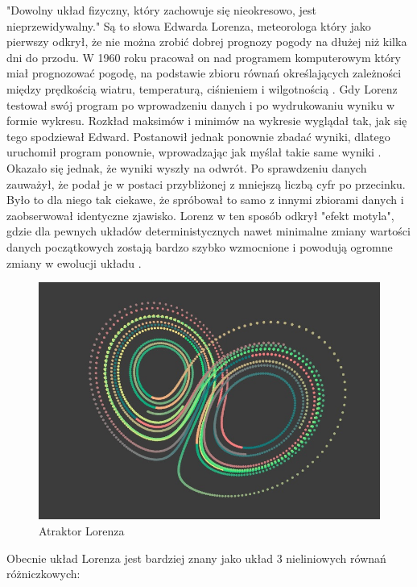 \documentclass[a4paper,12pt,reqno]{article}
\begin{document}
"Dowolny układ fizyczny, który zachowuje się nieokresowo, jest nieprzewidywalny." Są to słowa Edwarda Lorenza, meteorologa który jako pierwszy odkrył, że nie można zrobić dobrej prognozy pogody na dłużej niż kilka dni do przodu. W 1960 roku pracował on nad programem komputerowym który miał prognozować pogodę, na podstawie zbioru równań określających zależności między prędkością wiatru, temperaturą, ciśnieniem i wilgotnością \cite{burze_motyle}. Gdy Lorenz testował swój program po wprowadzeniu danych i po wydrukowaniu wyniku w formie wykresu. Rozkład maksimów i minimów na wykresie wyglądał tak, jak się tego spodziewał Edward. Postanowił jednak ponownie zbadać wyniki, dlatego uruchomił program ponownie, wprowadzając jak myślał takie same wyniki \cite{burze_motyle}. Okazało się jednak, że wyniki wyszły na odwrót. Po sprawdzeniu danych zauważył, że podał je w postaci przybliżonej z mniejszą liczbą cyfr po przecinku. Było to dla niego tak ciekawe, że spróbował to samo z innymi zbiorami danych i zaobserwował identyczne zjawisko. Lorenz w ten sposób odkrył "efekt motyla", gdzie dla pewnych układów deterministycznych nawet minimalne zmiany wartości danych początkowych zostają bardzo szybko wzmocnione i powodują ogromne zmiany w ewolucji układu \cite{burze_motyle}.

\begin{figure}[H]%
\centering
\includegraphics[width=0.7\columnwidth]{graphics/butterfly/Lorenz_Attractor.jpg}
\caption{Atraktor Lorenza 
\label{BPExample}}%
%
\qquad
\end{figure} 

Obecnie układ Lorenza jest bardziej znany jako układ 3 nieliniowych
równań różniczkowych\cite{lorenz_dziwne_atraktory}:
\end{document}
